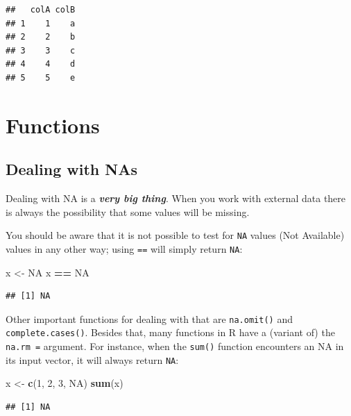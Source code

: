 \documentclass[]{book}
\newenvironment{Shaded}{\begin{snugshade}}{\end{snugshade}}
\newcommand{\DecValTok}[1]{\textcolor[rgb]{0.00,0.00,0.81}{#1}}
\newcommand{\KeywordTok}[1]{\textcolor[rgb]{0.13,0.29,0.53}{\textbf{#1}}}
\newcommand{\NormalTok}[1]{#1}
\newcommand{\OperatorTok}[1]{\textcolor[rgb]{0.81,0.36,0.00}{\textbf{#1}}}
\newcommand{\OtherTok}[1]{\textcolor[rgb]{0.56,0.35,0.01}{#1}}
\newcommand{\StringTok}[1]{\textcolor[rgb]{0.31,0.60,0.02}{#1}}
\begin{document}
\begin{verbatim}
##   colA colB
## 1    1    a
## 2    2    b
## 3    3    c
## 4    4    d
## 5    5    e
\end{verbatim}

\hypertarget{functions-1}{%
\chapter{Functions}\label{functions-1}}

\hypertarget{dealing-with-nas}{%
\section{Dealing with NAs}\label{dealing-with-nas}}

Dealing with NA is a \textbf{\emph{very big thing}}. When you work with external data there is always the possibility that some values will be missing.

You should be aware that it is not possible to test for \texttt{NA} values (Not Available) values in any other way; using \texttt{==} will simply return \texttt{NA}:

\begin{Shaded}
\begin{Highlighting}[]
\NormalTok{x <-}\StringTok{ }\OtherTok{NA}
\NormalTok{x }\OperatorTok{==}\StringTok{ }\OtherTok{NA}
\end{Highlighting}
\end{Shaded}

\begin{verbatim}
## [1] NA
\end{verbatim}

Other important functions for dealing with that are \texttt{na.omit()} and \texttt{complete.cases()}. Besides that, many functions in R have a (variant of) the \texttt{na.rm\ =} argument. For instance, when the \texttt{sum()} function encounters an NA in its input vector, it will always return \texttt{NA}:

\begin{Shaded}
\begin{Highlighting}[]
\NormalTok{x <-}\StringTok{ }\KeywordTok{c}\NormalTok{(}\DecValTok{1}\NormalTok{, }\DecValTok{2}\NormalTok{, }\DecValTok{3}\NormalTok{, }\OtherTok{NA}\NormalTok{)}
\KeywordTok{sum}\NormalTok{(x)}
\end{Highlighting}
\end{Shaded}

\begin{verbatim}
## [1] NA
\end{verbatim}
\end{document}
